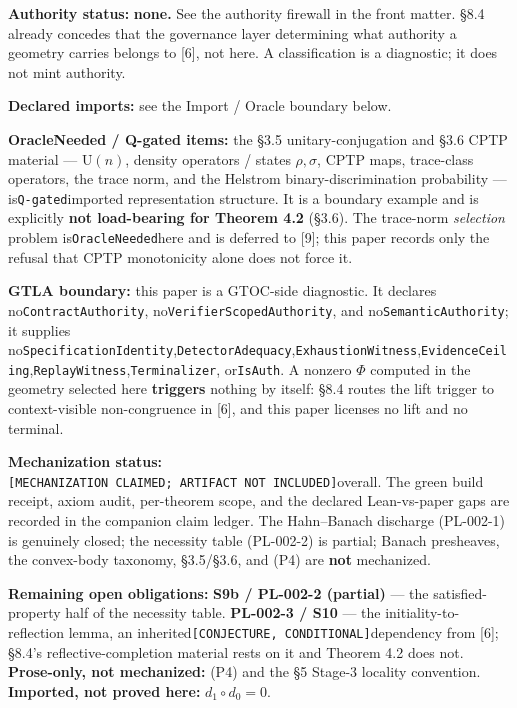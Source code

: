 \documentclass[
  11pt,
]{article}
\begin{document}
\textbf{Authority status:} \textbf{none.} See the authority firewall in the front matter. §8.4 already concedes that the governance layer determining what authority a geometry carries belongs to {[}6{]}, not here. A classification is a diagnostic; it does not mint authority.

\textbf{Declared imports:} see the Import / Oracle boundary below.

\textbf{OracleNeeded / Q-gated items:} the §3.5 unitary-conjugation and §3.6 CPTP material --- \(\mathrm{U}(n)\), density operators / states \(\rho,\sigma\), CPTP maps, trace-class operators, the trace norm, and the Helstrom binary-discrimination probability --- is\texttt{Q-gated}imported representation structure. It is a boundary example and is explicitly \textbf{not load-bearing for Theorem 4.2} (§3.6). The trace-norm \emph{selection} problem is\texttt{OracleNeeded}here and is deferred to {[}9{]}; this paper records only the refusal that CPTP monotonicity alone does not force it.

\textbf{GTLA boundary:} this paper is a GTOC-side diagnostic. It declares no\texttt{ContractAuthority}, no\texttt{VerifierScopedAuthority}, and no\texttt{SemanticAuthority}; it supplies no\texttt{SpecificationIdentity},\texttt{DetectorAdequacy},\texttt{ExhaustionWitness},\texttt{EvidenceCeiling},\texttt{ReplayWitness},\texttt{Terminalizer}, or\texttt{IsAuth}. A nonzero \(\Phi\) computed in the geometry selected here \textbf{triggers} nothing by itself: §8.4 routes the lift trigger to context-visible non-congruence in {[}6{]}, and this paper licenses no lift and no terminal.

\textbf{Mechanization status:}\texttt{{[}MECHANIZATION\ CLAIMED;\ ARTIFACT\ NOT\ INCLUDED{]}}overall. The green build receipt, axiom audit, per-theorem scope, and the declared Lean-vs-paper gaps are recorded in the companion claim ledger. The Hahn--Banach discharge (PL-002-1) is genuinely closed; the necessity table (PL-002-2) is partial; Banach presheaves, the convex-body taxonomy, §3.5/§3.6, and (P4) are \textbf{not} mechanized.

\textbf{Remaining open obligations:} \textbf{S9b / PL-002-2 (partial)} --- the satisfied-property half of the necessity table. \textbf{PL-002-3 / S10} --- the initiality-to-reflection lemma, an inherited\texttt{{[}CONJECTURE,\ CONDITIONAL{]}}dependency from {[}6{]}; §8.4's reflective-completion material rests on it and Theorem 4.2 does not. \textbf{Prose-only, not mechanized:} (P4) and the §5 Stage-3 locality convention. \textbf{Imported, not proved here:} \(d_1\circ d_0=0\).
\end{document}

